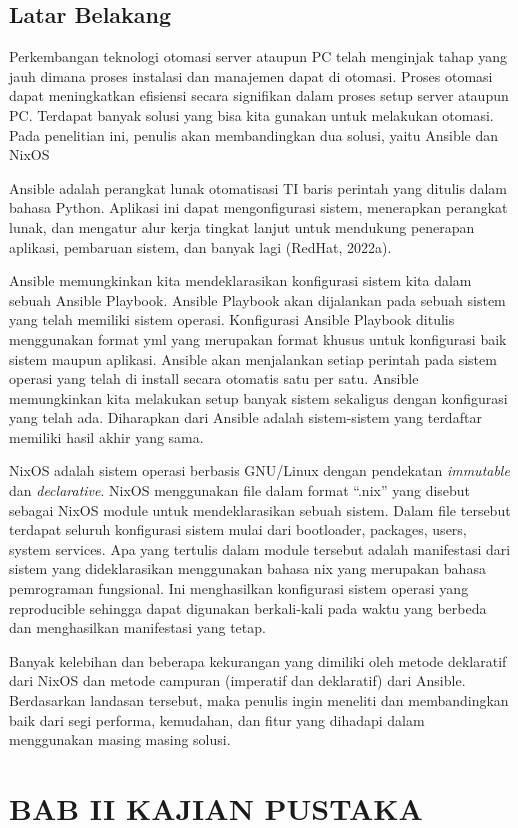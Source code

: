 \documentclass[10pt,]{report}
\begin{document}
\section{Latar Belakang}
\begin{adjustwidth}{0.75cm}{}
	\hspace{\parindent}Perkembangan teknologi otomasi server ataupun PC telah
	menginjak tahap yang jauh dimana proses instalasi dan manajemen dapat di
	otomasi. Proses otomasi dapat meningkatkan efisiensi secara signifikan dalam
	proses setup server ataupun PC. Terdapat banyak solusi yang bisa kita
	gunakan untuk melakukan otomasi. Pada penelitian ini, penulis akan
	membandingkan dua solusi, yaitu Ansible dan NixOS

	Ansible adalah perangkat lunak otomatisasi TI baris perintah yang ditulis
	dalam bahasa Python. Aplikasi ini dapat mengonfigurasi sistem, menerapkan
	perangkat lunak, dan mengatur alur kerja tingkat lanjut untuk mendukung
	penerapan aplikasi, pembaruan sistem, dan banyak lagi (RedHat, 2022a).

	Ansible memungkinkan kita mendeklarasikan konfigurasi sistem kita dalam
	sebuah Ansible Playbook. Ansible Playbook akan dijalankan pada sebuah sistem
	yang telah memiliki sistem operasi. Konfigurasi Ansible Playbook ditulis
	menggunakan format yml yang merupakan format khusus untuk konfigurasi baik
	sistem maupun aplikasi. Ansible akan menjalankan setiap perintah pada sistem
	operasi yang telah di install secara otomatis satu per satu. Ansible
	memungkinkan kita melakukan setup banyak sistem sekaligus dengan konfigurasi
	yang telah ada. Diharapkan dari Ansible adalah sistem-sistem yang terdaftar
	memiliki hasil akhir yang sama.

	NixOS adalah sistem operasi berbasis GNU/Linux dengan pendekatan
		{\it immutable}  dan {\it declarative}. NixOS menggunakan file dalam format “.nix”
	yang disebut sebagai NixOS module untuk mendeklarasikan sebuah sistem. Dalam
	file tersebut terdapat seluruh konfigurasi sistem mulai dari bootloader,
	packages, users, system services. Apa yang tertulis dalam module tersebut
	adalah manifestasi dari sistem yang dideklarasikan menggunakan bahasa nix
	yang merupakan bahasa pemrograman fungsional. Ini menghasilkan konfigurasi
	sistem operasi yang reproducible sehingga dapat digunakan berkali-kali pada
	waktu yang berbeda dan menghasilkan manifestasi yang tetap.

	Banyak kelebihan dan beberapa kekurangan yang dimiliki oleh metode deklaratif
	dari NixOS dan metode campuran (imperatif dan deklaratif) dari Ansible.
	Berdasarkan landasan tersebut, maka penulis ingin meneliti dan membandingkan
	baik dari segi performa, kemudahan, dan fitur yang dihadapi dalam menggunakan
	masing masing solusi.
\end{adjustwidth}
% 
\chapter*{BAB II KAJIAN PUSTAKA}
\end{document}
